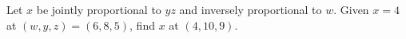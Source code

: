 Let $ x $ be jointly proportional to $ yz $ and inversely proportional to $ w $. Given $ x=4 $ at $(w,y,z)=(6,8,5)$, find $ x $ at $(4,10,9)$.
